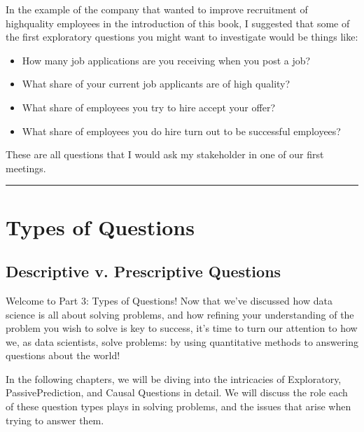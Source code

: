 \documentclass[letterpaper,10pt,english]{jupyterBook}
\begin{document}
\sphinxAtStartPar
In the example of the company that wanted to improve recruitment of high\sphinxhyphen{}quality employees in the introduction of this book, I suggested that some of the first exploratory questions you might want to investigate would be things like:
\begin{itemize}
\item {} 
\sphinxAtStartPar
How many job applications are you receiving when you post a job?

\item {} 
\sphinxAtStartPar
What share of your current job applicants are of high quality?

\item {} 
\sphinxAtStartPar
What share of employees you try to hire accept your offer?

\item {} 
\sphinxAtStartPar
What share of employees you do hire turn out to be successful employees?

\end{itemize}

\sphinxAtStartPar
These are all questions that I would ask my stakeholder in one of our first meetings.


\bigskip\hrule\bigskip


\sphinxstepscope


\part{Types of Questions}

\sphinxstepscope


\chapter{Descriptive v. Prescriptive Questions}
\label{\detokenize{30_questions/05_descriptive_v_prescriptive:descriptive-v-prescriptive-questions}}\label{\detokenize{30_questions/05_descriptive_v_prescriptive::doc}}
\sphinxAtStartPar
Welcome to Part 3: Types of Questions! Now that we’ve discussed how data science is all about solving problems, and how refining your understanding of the problem you wish to solve is key to success, it’s time to turn our attention to how we, as data scientists, solve problems: by using quantitative methods to answering questions about the world!

\sphinxAtStartPar
In the following chapters, we will be diving into the intricacies of Exploratory, Passive\sphinxhyphen{}Prediction, and Causal Questions in detail. We will discuss the role each of these question types plays in solving problems, and the issues that arise when trying to answer them.
\end{document}
